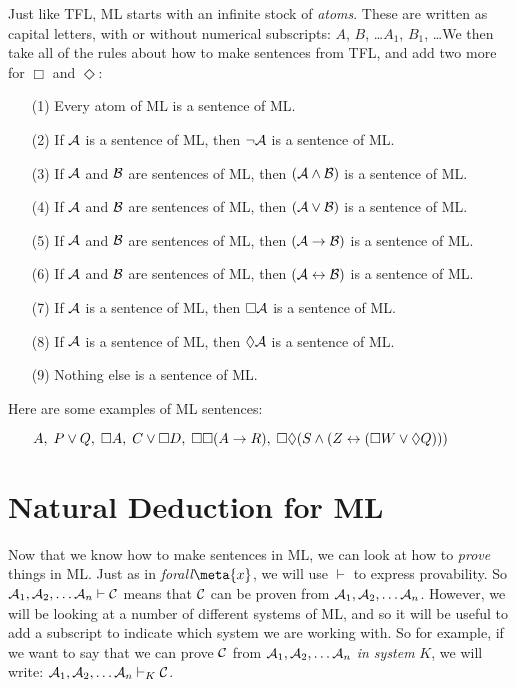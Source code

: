 Just like TFL, ML starts with an infinite stock of \emph{atoms}. These are written as capital letters, with or without numerical subscripts: $A$, $B$, \dots  $A_1$, $B_1$, \dots  We then take all of the rules about how to make sentences from TFL, and add two more for $\Box$ and $\Diamond$:
\begin{itemize}
\item[(1)]Every atom of ML is a sentence of ML.
\item[(2)]If $\mathcal{A}$ is a sentence of ML, then $\neg\mathcal{A}$ is a sentence of ML.
\item[(3)]If $\mathcal{A}$ and $\mathcal{B}$ are sentences of ML, then $(\mathcal{A}\wedge\mathcal{B})$ is a sentence of ML.
\item[(4)]If $\mathcal{A}$ and $\mathcal{B}$ are sentences of ML, then $(\mathcal{A}\vee\mathcal{B})$ is a sentence of ML.
\item[(5)]If $\mathcal{A}$ and $\mathcal{B}$ are sentences of ML, then $(\mathcal{A}\rightarrow\mathcal{B})$ is a sentence of ML.
\item[(6)]If $\mathcal{A}$ and $\mathcal{B}$ are sentences of ML, then $(\mathcal{A}\leftrightarrow\mathcal{B})$ is a sentence of ML.
\item[(7)]If $\mathcal{A}$ is a sentence of ML, then $\Box\mathcal{A}$ is a sentence of ML.
\item[(8)]If $\mathcal{A}$ is a sentence of ML, then $\Diamond\mathcal{A}$ is a sentence of ML.
\item[(9)]Nothing else is a sentence of ML.
\end{itemize}
Here are some examples of ML sentences:
\begin{itemize}
\item[]$A,\;P\vee Q,\;\Box A,\;C\vee \Box D,\;\Box\Box (A\rightarrow R),\;\Box\Diamond (S\wedge (Z\leftrightarrow (\Box W \vee \Diamond Q)))$
\end{itemize}

\chapter{Natural Deduction for ML}
\label{Proof}

Now that we know how to make sentences in ML, we can look at how to \emph{prove} things in ML. Just as in \emph{forall}$\meta{x}$, we will use $\vdash$ to express provability.  So $\mathcal{A}_1,\mathcal{A}_2, \dots \mathcal{A}_n \vdash \mathcal{C}$ means that $\mathcal{C}$ can be proven from $\mathcal{A}_1,\mathcal{A}_2, \dots \mathcal{A}_n$. However, we will be looking at a number of different systems of ML, and so it will be useful to add a subscript to indicate which system we are working with. So for example, if we want to say that we can prove $\mathcal{C}$ from $\mathcal{A}_1,\mathcal{A}_2, \dots \mathcal{A}_n$ \emph{in system} $K$, we will write: $\mathcal{A}_1,\mathcal{A}_2, \dots \mathcal{A}_n \vdash_K \mathcal{C}$.

